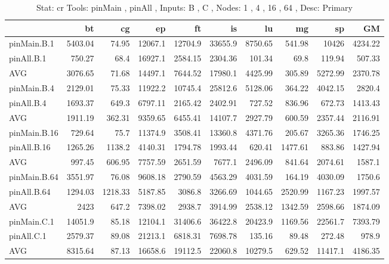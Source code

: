 \begin{table*}[]
\caption{Stat: cr 
 Tools: pinMain , pinAll ,  
 Inputs: B , C ,  
 Nodes: 1 , 4 , 16 , 64 ,  
 Desc: Primary}
\begin{center}
\begin{tabular}{lrrrrrrrrr}
\hline
              &      bt &      cg &      ep &      ft &      is &      lu &      mg &      sp &      GM \\
\hline
 pinMain.B.1  & 5403.04 &   74.95 & 12067.1 & 12704.9 & 33655.9 & 8750.65 &  541.98 &   10426 & 4234.22 \\
 pinAll.B.1   &  750.27 &    68.4 & 16927.1 & 2584.15 & 2304.36 &  101.34 &    69.8 &  119.94 &  507.33 \\
 AVG          & 3076.65 &   71.68 & 14497.1 & 7644.52 & 17980.1 & 4425.99 &  305.89 & 5272.99 & 2370.78 \\
 pinMain.B.4  & 2129.01 &   75.33 & 11922.2 & 10745.4 & 25812.6 & 5128.06 &  364.22 & 4042.15 &  2820.4 \\
 pinAll.B.4   & 1693.37 &   649.3 & 6797.11 & 2165.42 & 2402.91 &  727.52 &  836.96 &  672.73 & 1413.43 \\
 AVG          & 1911.19 &  362.31 & 9359.65 & 6455.41 & 14107.7 & 2927.79 &  600.59 & 2357.44 & 2116.91 \\
 pinMain.B.16 &  729.64 &    75.7 & 11374.9 & 3508.41 & 13360.8 & 4371.76 &  205.67 & 3265.36 & 1746.25 \\
 pinAll.B.16  & 1265.26 &  1138.2 & 4140.31 & 1794.78 & 1993.44 &  620.41 & 1477.61 &  883.86 & 1427.94 \\
 AVG          &  997.45 &  606.95 & 7757.59 & 2651.59 &  7677.1 & 2496.09 &  841.64 & 2074.61 &  1587.1 \\
 pinMain.B.64 & 3551.97 &   76.08 & 9608.18 & 2790.59 & 4563.29 & 4031.59 &  164.19 & 4030.09 &  1750.6 \\
 pinAll.B.64  & 1294.03 & 1218.33 & 5187.85 &  3086.8 & 3266.69 & 1044.65 & 2520.99 & 1167.23 & 1997.57 \\
 AVG          &    2423 &   647.2 & 7398.02 &  2938.7 & 3914.99 & 2538.12 & 1342.59 & 2598.66 & 1874.09 \\
 pinMain.C.1  & 14051.9 &   85.18 & 12104.1 & 31406.6 & 36422.8 & 20423.9 & 1169.56 & 22561.7 & 7393.79 \\
 pinAll.C.1   & 2579.37 &   89.08 & 21213.1 & 6818.31 & 7698.78 &  135.16 &   89.48 &  272.48 &   978.9 \\
 AVG          & 8315.64 &   87.13 & 16658.6 & 19112.5 & 22060.8 & 10279.5 &  629.52 & 11417.1 & 4186.35 \\

\end{tabular}
\end{center}
\end{table*}

